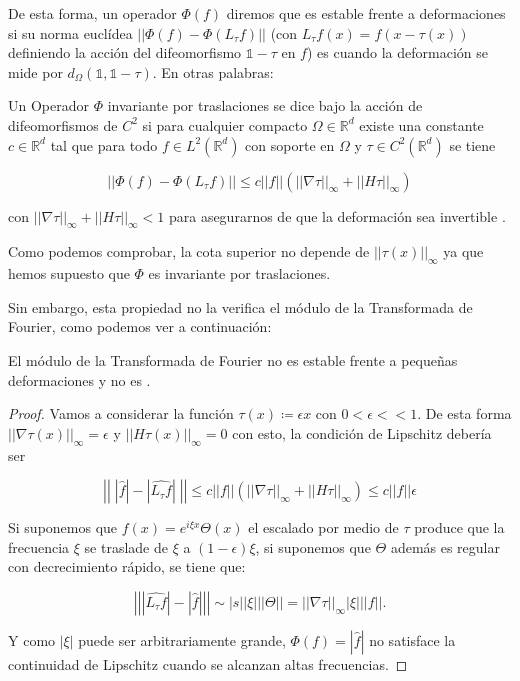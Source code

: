 \medskip 

\noindent De esta forma, un operador $\Phi(f)$ diremos que es estable frente a deformaciones si su norma euclídea $\left|\left| \Phi(f) - \Phi(L_\tau f) \right| \right|$ (con $L_{\tau} f(x)=f(x-\tau(x))$ definiendo la acción del difeomorfismo $\mathbb{1}-\tau$ en $f$) es  cuando la deformación se mide por $d_\Omega(\mathbb{1},\mathbb{1}-\tau)$. En otras palabras: 

\begin{definicion}
    Un Operador $\Phi$ invariante por traslaciones  se dice  bajo la acción de difeomorfismos de $C^2$ si para cualquier compacto $\Omega \in \mathbb{R}^d$ existe una constante $c\in \mathbb{R}^d$ tal que para todo $f\in L^2(\mathbb{R}^d)$ con soporte en $\Omega$ y $\tau \in C^2(\mathbb{R}^d)$ se tiene
    
    $$\left|\left| \Phi(f) - \Phi(L_\tau f) \right| \right| \leq c ||f|| (||\nabla \tau ||_{\infty} + ||H\tau||_\infty)$$
    
    con  $|| \nabla \tau ||_\infty + ||H \tau ||_\infty < 1$ para asegurarnos de que la deformación sea invertible \cite{doi:10.1137/S0036141002404838}.
\end{definicion}

\noindent Como podemos comprobar, la cota superior no depende de $||\tau(x)||_\infty$ ya que hemos supuesto que $\Phi$ es invariante por traslaciones. 

\noindent Sin embargo, esta propiedad no la verifica el módulo de la Transformada de Fourier, como podemos ver a continuación:

\begin{lema} \label{lemma:TF_inestable_difeomorfismos}
El módulo de la Transformada de Fourier no es estable frente a pequeñas deformaciones y no es .
\end{lema}

\begin{proof}
\noindent Vamos a considerar la función $\tau(x)\coloneqq \epsilon x$ con $0 < \epsilon << 1$. De esta forma $||\nabla \tau (x) ||_\infty = \epsilon$ y $||H\tau(x)||_\infty=0$ con esto, la condición de Lipschitz debería ser

$$\left|\left| \; |\widehat{f}| -|\widehat{L_\tau f}| \; \right|\right| \leq c ||f|| (||\nabla \tau ||_{\infty} + ||H\tau||_\infty) \leq c ||f|| \epsilon$$

\noindent Si suponemos que $f(x)=e^{i\xi x} \Theta(x)$ el escalado por medio de $\tau$ produce que la frecuencia $\xi$ se traslade de $\xi$ a $(1-\epsilon)\xi$, si suponemos que $\Theta$ además es regular con decrecimiento rápido, se tiene que:

$$\left|\left| |\widehat{L_\tau f}|-|\widehat{f}| \right|\right| \sim |s| |\xi| ||\Theta|| = ||\nabla \tau||_\infty |\xi| ||f||.$$

\noindent Y como $|\xi|$ puede ser arbitrariamente grande, $\Phi(f)=|\widehat{f}|$ no satisface la continuidad de Lipschitz cuando se alcanzan altas frecuencias.
\end{proof}
    
